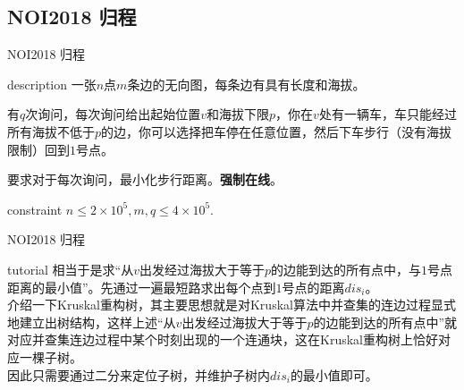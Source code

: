\documentclass{beamer}
\begin{document}
\subsection{NOI2018 归程}
\begin{frame}{NOI2018 归程}
	\begin{block}{description}
		一张$n$点$m$条边的无向图，每条边有具有长度和海拔。
		
		有$q$次询问，每次询问给出起始位置$v$和海拔下限$p$，你在$v$处有一辆车，车只能经过所有海拔不低于$p$的边，你可以选择把车停在任意位置，然后下车步行（没有海拔限制）回到$1$号点。
		
		要求对于每次询问，最小化步行距离。\textbf{强制在线}。
	\end{block}
	\begin{block}{constraint}
		$n \le 2 \times 10^5, m, q \le 4 \times 10^5.$
	\end{block}
\end{frame}
\begin{frame}{NOI2018 归程}
	\begin{block}{tutorial}
		相当于是求“从$v$出发经过海拔大于等于$p$的边能到达的所有点中，与$1$号点距离的最小值”。先通过一遍最短路求出每个点到$1$号点的距离$dis_i$。\\
		
		介绍一下Kruskal重构树，其主要思想就是对Kruskal算法中并查集的连边过程显式地建立出树结构，这样上述“从$v$出发经过海拔大于等于$p$的边能到达的所有点中”就对应并查集连边过程中某个时刻出现的一个连通块，这在Kruskal重构树上恰好对应一棵子树。\\
		
		因此只需要通过二分来定位子树，并维护子树内$dis_i$的最小值即可。
	\end{block}
\end{frame}
\end{document}
